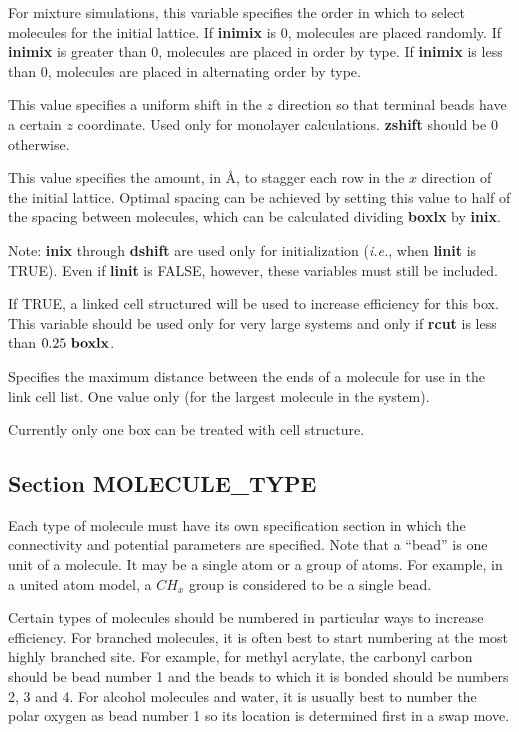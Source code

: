 \documentclass[12pt,letterpaper]{article}
\begin{document}
 For mixture simulations, this
variable specifies the order in which to select molecules
for the initial lattice. If {\bf inimix} is 0, molecules are
placed randomly. If {\bf inimix} is greater than 0,
molecules are placed in order by type. If {\bf inimix} is
less than 0, molecules are placed in alternating order by
type.

 This value specifies a uniform shift
in the $z$ direction so that terminal beads have a certain
$z$ coordinate. Used only for monolayer calculations. {\bf
  zshift} should be 0 otherwise.

 This value specifies the amount, in
\AA, to stagger each row in the $x$ direction of the initial
lattice. Optimal spacing can be achieved by setting this
value to half of the spacing between molecules, which can be
calculated dividing {\bf boxlx} by {\bf inix}.

Note: \textbf{inix} through \textbf{dshift} are used only
for initialization (\textit{i.e.}, when {\bf linit} is
TRUE). Even if {\bf linit} is FALSE, however, these
variables must still be included.

 If TRUE, a linked cell
structured will be used to increase efficiency for this box.
This variable should be used only for very large systems and
only if {\bf rcut} is less than $0.25~{\bf boxlx}$.

 Specifies the maximum distance
between the ends of a molecule for use in the link cell
list. One value only (for the largest molecule in the
system).

Currently only one box can be treated with cell structure.

\subsection{Section \textbf{MOLECULE\_TYPE}}
Each type of molecule must have its own specification
section in which the connectivity and potential parameters
are specified. Note that a ``bead'' is one unit of a
molecule. It may be a single atom or a group of atoms. For
example, in a united atom model, a $CH_x$ group is
considered to be a single bead.

Certain types of molecules should be numbered in particular
ways to increase efficiency. For branched molecules, it is
often best to start numbering at the most highly branched
site. For example, for methyl acrylate, the carbonyl carbon
should be bead number 1 and the beads to which it is bonded
should be numbers 2, 3 and 4. For alcohol molecules and
water, it is usually best to number the polar oxygen as bead
number 1 so its location is determined first in a swap move.
\end{document}
